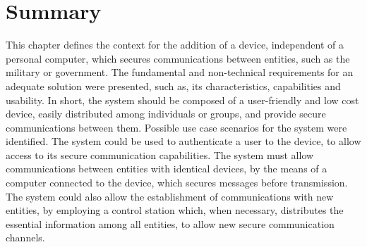 



\section*{Summary}\label{chap:problem:summary}

This chapter defines the context for the addition of a device, independent of a personal computer, which secures communications between entities, such as the military or government.
The fundamental and non-technical requirements for an adequate solution were presented, such as, its characteristics, capabilities and usability. In short, the system should be composed of a user-friendly and low cost device, easily distributed among individuals or groups, and provide secure communications between them.
Possible use case scenarios for the system were identified.
The system could be used to authenticate a user to the device, to allow access to its secure communication capabilities. The system must allow communications between entities with identical devices, by the means of a computer connected to the device, which secures messages before transmission.
The system could also allow the establishment of communications with new entities, by employing a control station which, when necessary, distributes the essential information among all entities, to allow new secure communication channels.
